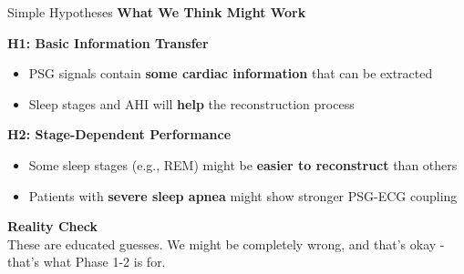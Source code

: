 \documentclass[aspectratio=169,11pt]{beamer}
\begin{document}
\iffalse %

\begin{frame}{Simple Hypotheses}
  \textbf{\textcolor{tcairemblue}{\Large What We Think Might Work}}
  
  \vspace{1.5em}
  \textbf{\textcolor{tcairemgreen}{\large H1: Basic Information Transfer}}
      \begin{itemize}
    \large
    \item PSG signals contain \textbf{some cardiac information} that can be extracted
    \vspace{0.5em}
    \item Sleep stages and AHI will \textbf{help} the reconstruction process
      \end{itemize}
      
  \vspace{1.5em}
  \textbf{\textcolor{tcairemorange}{\large H2: Stage-Dependent Performance}}
      \begin{itemize}
    \large
    \item Some sleep stages (e.g., REM) might be \textbf{easier to reconstruct} than others
    \vspace{0.5em}
    \item Patients with \textbf{severe sleep apnea} might show stronger PSG-ECG coupling
      \end{itemize}
      
  \vspace{1.5em}
  \colorbox{tcairemblue!15}{\parbox{0.95\textwidth}{
    \large
    \textcolor{tcairemblue}{\textbf{Reality Check}}\\
    \vspace{0.5em}
    \normalsize
    These are educated guesses. We might be completely wrong, and that's okay - 
    that's what Phase 1-2 is for.
  }}
\end{frame}
\end{document}
